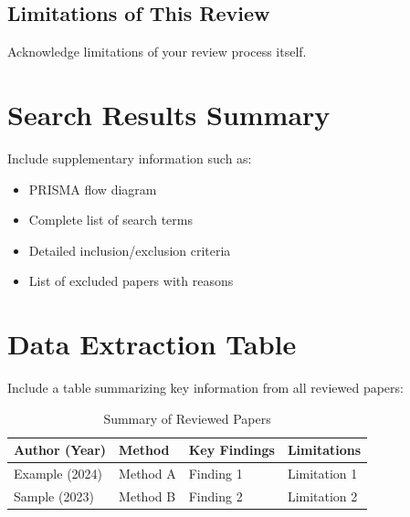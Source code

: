 \documentclass[11pt,a4paper]{article}
\begin{document}
\subsection{Limitations of This Review}
Acknowledge limitations of your review process itself.

\newpage



\newpage
\appendix
\section{Search Results Summary}
\label{app:search}

Include supplementary information such as:
\begin{itemize}
    \item PRISMA flow diagram
    \item Complete list of search terms
    \item Detailed inclusion/exclusion criteria
    \item List of excluded papers with reasons
\end{itemize}

\section{Data Extraction Table}
\label{app:data}

Include a table summarizing key information from all reviewed papers:

\begin{table}[htbp]
\centering
\caption{Summary of Reviewed Papers}
\label{tab:papers}
\begin{tabular}{@{}p{2cm}p{3cm}p{3cm}p{4cm}@{}}
\toprule
\textbf{Author (Year)} & \textbf{Method} & \textbf{Key Findings} & \textbf{Limitations} \\
\midrule
Example (2024) & Method A & Finding 1 & Limitation 1 \\
Sample (2023) & Method B & Finding 2 & Limitation 2 \\
\bottomrule
\end{tabular}
\end{table}
\end{document}
